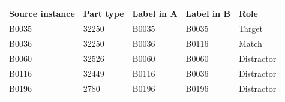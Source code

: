 \begin{tabular}{@{}lllll@{}}
\toprule
Source instance & Part type & Label in A & Label in B & Role\\
\midrule
B0035 & 32250 & B0035 & B0035 & Target\\
B0036 & 32250 & B0036 & B0116 & Match\\
B0060 & 32526 & B0060 & B0060 & Distractor\\
B0116 & 32449 & B0116 & B0036 & Distractor\\
B0196 & 2780 & B0196 & B0196 & Distractor\\
\bottomrule
\end{tabular}
